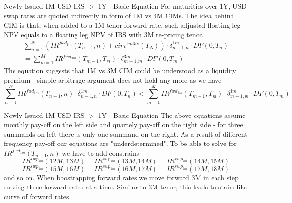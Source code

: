 \documentclass{beamer}
\begin{document}
\begin{frame}{Newly Issued 1M USD IRS $>$ 1Y - Basic Equation}
For maturities over 1Y, USD swap rates are quoted indirectly in form of 1M vs 3M CIMs. The idea behind CIM is that, when added to a 1M tenor forward rate, such adjusted floating leg NPV equals to a floating leg NPV of IRS with 3M re-pricing tenor.
\begin{multline*}
\sum_{n = 1}^N \left(IR^{fwd_{1m}}(T_{n-1}, n) + cim^{1m3m}(T_N) \right) \cdot \delta_{n - 1, n}^{1m} \cdot DF(0, T_n)\\
= \sum_{m = 1}^M IR^{fwd_{3m}}(T_{m-1}, T_m) \cdot \delta_{m - 1, m}^{3m} \cdot DF(0, T_m)
\end{multline*}
The equation suggests that 1M vs 3M CIM could be understood as a liquidity premium - simple arbitrage argument does not hold any more as we have
\begin{equation*}
\sum_{n = 1}^N IR^{fwd_{1m}}(T_{n-1}, n) \cdot \delta_{n - 1, n}^{1m} \cdot DF(0, T_n) < \sum_{m = 1}^M IR^{fwd_{3m}}(T_{m-1}, T_m) \cdot \delta_{m - 1, m}^{3m} \cdot DF(0, T_m)
\end{equation*}
\end{frame}

\begin{frame}{Newly Issued 1M USD IRS $>$ 1Y - Basic Equation}
The above equations assume monthly pay-off on the left side and quartely pay-off on the right side - for three summands on left there is only one summand on the right. As a result of different frequency pay-off our equations are "underdetermined". To be able to solve for $IR^{fwd_{1m}}(T_{n-1}, n)$ we have to add constrains
\begin{equation*}
IR^{swp_{1m}}(12M, 13M) = IR^{swp_{1m}}(13M, 14M) = IR^{swp_{1m}}(14M, 15M)
\end{equation*}
\begin{equation*}
IR^{swp_{1m}}(15M, 16M) = IR^{swp_{1m}}(16M, 17M) = IR^{swp_{1m}}(17M, 18M)
\end{equation*}
and so on. When boostrapping forward rates we move forward 3M in each step solving three forward rates at a time. Similar to 3M tenor, this leads to stairs-like curve of forward rates.
\end{frame}
\end{document}
